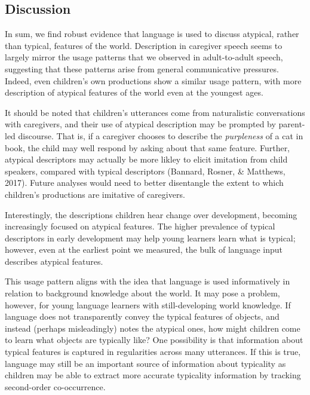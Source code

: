 \documentclass[10pt, letterpaper]{article}
\begin{document}
\hypertarget{discussion}{%
\subsection{Discussion}\label{discussion}}

In sum, we find robust evidence that language is used to discuss
atypical, rather than typical, features of the world. Description in
caregiver speech seems to largely mirror the usage patterns that we
observed in adult-to-adult speech, suggesting that these patterns arise
from general communicative pressures. Indeed, even children's own
productions show a similar usage pattern, with more description of
atypical features of the world even at the youngest ages.

It should be noted that children's utterances come from naturalistic
conversations with caregivers, and their use of atypical description may
be prompted by parent-led discourse. That is, if a caregiver chooses to
describe the \emph{purpleness} of a cat in book, the child may well
respond by asking about that same feature. Further, atypical descriptors
may actually be more likley to elicit imitation from child speakers,
compared with typical descriptors (Bannard, Rosner, \& Matthews, 2017).
Future analyses would need to better disentangle the extent to which
children's productions are imitative of caregivers.

Interestingly, the descriptions children hear change over development,
becoming increasingly focused on atypical features. The higher
prevalence of typical descriptors in early development may help young
learners learn what is typical; however, even at the earliest point we
measured, the bulk of language input describes atypical features.

This usage pattern aligns with the idea that language is used
informatively in relation to background knowledge about the world. It
may pose a problem, however, for young language learners with
still-developing world knowledge. If language does not transparently
convey the typical features of objects, and instead (perhaps
misleadingly) notes the atypical ones, how might children come to learn
what objects are typically like? One possibility is that information
about typical features is captured in regularities across many
utterances. If this is true, language may still be an important source
of information about typicality as children may be able to extract more
accurate typicality information by tracking second-order co-occurrence.
\end{document}
